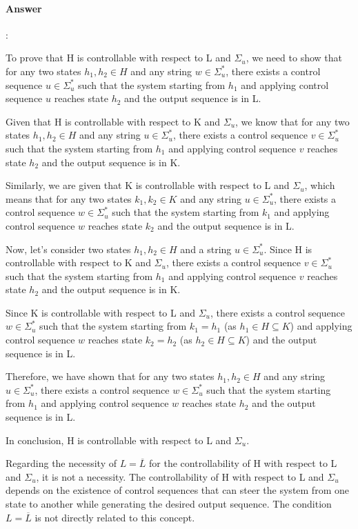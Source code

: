\documentclass{article}
\begin{document}
\paragraph{Answer}:

To prove that H is controllable with respect to L and $\Sigma_u$, we need to show that for any two states $h_1, h_2 \in H$ and any string $w \in \Sigma_u^*$, there exists a control sequence $u \in \Sigma_u^*$ such that the system starting from $h_1$ and applying control sequence $u$ reaches state $h_2$ and the output sequence is in L.

Given that H is controllable with respect to K and $\Sigma_u$, we know that for any two states $h_1, h_2 \in H$ and any string $u \in \Sigma_u^*$, there exists a control sequence $v \in \Sigma_u^*$ such that the system starting from $h_1$ and applying control sequence $v$ reaches state $h_2$ and the output sequence is in K.

Similarly, we are given that K is controllable with respect to L and $\Sigma_u$, which means that for any two states $k_1, k_2 \in K$ and any string $u \in \Sigma_u^*$, there exists a control sequence $w \in \Sigma_u^*$ such that the system starting from $k_1$ and applying control sequence $w$ reaches state $k_2$ and the output sequence is in L.

Now, let's consider two states $h_1, h_2 \in H$ and a string $u \in \Sigma_u^*$. Since H is controllable with respect to K and $\Sigma_u$, there exists a control sequence $v \in \Sigma_u^*$ such that the system starting from $h_1$ and applying control sequence $v$ reaches state $h_2$ and the output sequence is in K.

Since K is controllable with respect to L and $\Sigma_u$, there exists a control sequence $w \in \Sigma_u^*$ such that the system starting from $k_1 = h_1$ (as $h_1 \in H \subseteq K$) and applying control sequence $w$ reaches state $k_2 = h_2$ (as $h_2 \in H \subseteq K$) and the output sequence is in L.

Therefore, we have shown that for any two states $h_1, h_2 \in H$ and any string $u \in \Sigma_u^*$, there exists a control sequence $w \in \Sigma_u^*$ such that the system starting from $h_1$ and applying control sequence $w$ reaches state $h_2$ and the output sequence is in L.

In conclusion, H is controllable with respect to L and $\Sigma_u$.

Regarding the necessity of $L = \overline{L}$ for the controllability of H with respect to L and $\Sigma_u$, it is not a necessity. The controllability of H with respect to L and $\Sigma_u$ depends on the existence of control sequences that can steer the system from one state to another while generating the desired output sequence. The condition $L = \overline{L}$ is not directly related to this concept.
\end{document}
